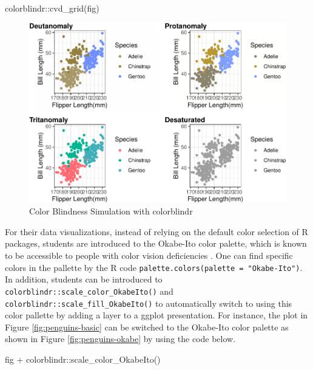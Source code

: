 \documentclass[12pt]{article}
\newenvironment{Shaded}{\begin{snugshade}}{\end{snugshade}}
\newcommand{\FunctionTok}[1]{\textcolor[rgb]{0.00,0.00,0.00}{#1}}
\newcommand{\NormalTok}[1]{#1}
\newcommand{\SpecialCharTok}[1]{\textcolor[rgb]{0.00,0.00,0.00}{#1}}
\begin{document}
\begin{Shaded}
\begin{Highlighting}[]
\NormalTok{colorblindr}\SpecialCharTok{::}\FunctionTok{cvd\_grid}\NormalTok{(fig)}
\end{Highlighting}
\end{Shaded}

\begin{figure}
\includegraphics{figure/penguins-cvd-1} \caption{Color Blindness Simulation with colorblindr}\label{fig:penguins-cvd}
\end{figure}

For their data visualizations, instead of relying on the default color selection of R packages, students are introduced to the Okabe-Ito color palette, which is known to be accessible to people with color vision deficiencies \citep{okabe}.
One can find specific colors in the pallette by the R code \texttt{palette.colors(palette\ =\ "Okabe-Ito")}.
In addition, students can be introduced to \texttt{colorblindr::scale\_color\_OkabeIto()} and \texttt{colorblindr::scale\_fill\_OkabeIto()} to automatically switch to using this color pallette by adding a layer to a ggplot presentation.
For instance, the plot in Figure \ref{fig:penguins-basic} can be switched to the Okabe-Ito color palette as shown in Figure \ref{fig:penguins-okabe} by using the code below.

\begin{Shaded}
\begin{Highlighting}[]
\NormalTok{fig }\SpecialCharTok{+}\NormalTok{ colorblindr}\SpecialCharTok{::}\FunctionTok{scale\_color\_OkabeIto}\NormalTok{()}
\end{Highlighting}
\end{Shaded}
\end{document}
